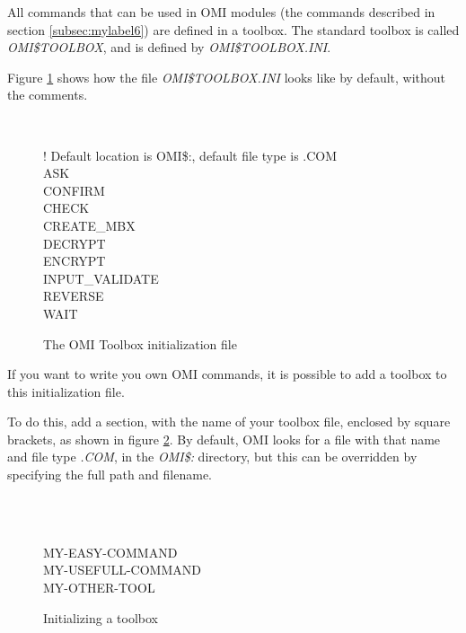 \documentclass[a4paper]{book}
\newcommand{\vs}{\vspace{3mm}}
\renewcommand{\indent}{\hspace*{5mm}}
\begin{document}
All commands that can be used in OMI modules (the commands described in 
section \ref{subsec:mylabel6}) are defined in a toolbox. The standard toolbox is called 
\linebreak\textsl{OMI{\$}TOOLBOX}, and is defined by \textsl{OMI{\$}TOOLBOX.INI}.

Figure \ref{fig:toolboxini} shows how the file \textsl{OMI{\$}TOOLBOX.INI} looks like by default, 
without the comments.

\begin{figure}[ht]
\begin{minipage}[t]{\textwidth}
\hrulefill \\
\begin{small}
\begin{ttfamily}
 ! Default location is OMI{\$}:, default file type is .COM \\
\indent ASK \\
\indent CONFIRM \\
\indent CHECK \\
\indent CREATE{\_}MBX \\
\indent DECRYPT \\
\indent ENCRYPT \\
\indent INPUT{\_}VALIDATE \\
\indent REVERSE \\
\indent WAIT \\
\end{ttfamily}
\end{small}
\caption{The OMI Toolbox initialization file}\label{fig:toolboxini}
\hrulefill
\end{minipage}
\end{figure}

\vs

If you want to write you own OMI commands, it is possible to add a toolbox 
to this initialization file.

To do this, add a section, with the name of your toolbox file, enclosed by 
square brackets, as shown in figure \ref{fig:toolboxadd}. By default, OMI looks for a file 
with that name and file type \textsl{.COM}, in the \textsl{OMI{\$}:} directory, but this can be 
overridden by specifying the full path and filename.

\begin{figure}[ht]
\begin{minipage}[t]{\textwidth}
\hrulefill \\
\begin{ttfamily}
\noindent[MY{\_}TOOLBOX] \\
\indent MY-EASY-COMMAND \\
\indent MY-USEFULL-COMMAND \\
\indent MY-OTHER-TOOL \\
\end{ttfamily}
\caption{Initializing a toolbox}\label{fig:toolboxadd}
\hrulefill
\end{minipage}
\end{figure}
\end{document}
